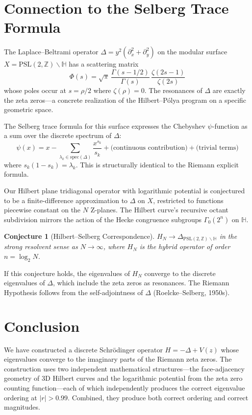 \documentclass[11pt,a4paper]{article}
\newtheorem{conjecture}[theorem]{Conjecture}
\theoremstyle{definition}
\begin{document}
\section{Connection to the Selberg Trace Formula}

The Laplace--Beltrami operator $\Delta = y^2(\partial_x^2 + \partial_y^2)$
on the modular surface $X = \mathrm{PSL}(2,\mathbb{Z})\backslash\mathbb{H}$
has a scattering matrix
\[
\Phi(s) = \sqrt{\pi}\,\frac{\Gamma(s-1/2)}{\Gamma(s)}\,
\frac{\zeta(2s-1)}{\zeta(2s)}
\]
whose poles occur at $s = \rho/2$ where $\zeta(\rho) = 0$. The
resonances of $\Delta$ are exactly the zeta zeros---a concrete
realization of the Hilbert--P\'{o}lya program on a specific geometric
space.

The Selberg trace formula for this surface expresses the Chebyshev
$\psi$-function as a sum over the discrete spectrum of $\Delta$:
\[
\psi(x) = x - \sum_{\lambda_k \in \mathrm{spec}(\Delta)}
\frac{x^{s_k}}{s_k} + \text{(continuous contribution)} +
\text{(trivial terms)}
\]
where $s_k(1-s_k) = \lambda_k$. This is structurally identical to the
Riemann explicit formula.

Our Hilbert plane tridiagonal operator with logarithmic potential is
conjectured to be a finite-difference approximation to $\Delta$ on
$X$, restricted to functions piecewise constant on the $N$ Z-planes.
The Hilbert curve's recursive octant subdivision mirrors the action
of the Hecke congruence subgroups $\Gamma_0(2^n)$ on $\mathbb{H}$.

\begin{conjecture}[Hilbert--Selberg Correspondence]
$H_N \to \Delta_{\mathrm{PSL}(2,\mathbb{Z})\backslash\mathbb{H}}$ in
the strong resolvent sense as $N \to \infty$, where $H_N$ is the
hybrid operator of order $n = \log_2 N$.
\end{conjecture}

If this conjecture holds, the eigenvalues of $H_N$ converge to the
discrete eigenvalues of $\Delta$, which include the zeta zeros as
resonances. The Riemann Hypothesis follows from the self-adjointness
of $\Delta$ (Roelcke--Selberg, 1950s).

\section{Conclusion}

We have constructed a discrete Schr\"{o}dinger operator
$H = -\Delta + V(z)$ whose eigenvalues converge to the imaginary parts
of the Riemann zeta zeros. The construction uses two independent
mathematical structures---the face-adjacency geometry of 3D Hilbert
curves and the logarithmic potential from the zeta zero counting
function---each of which independently produces the correct eigenvalue
ordering at $|r| > 0.99$. Combined, they produce both correct ordering
and correct magnitudes.
\end{document}
